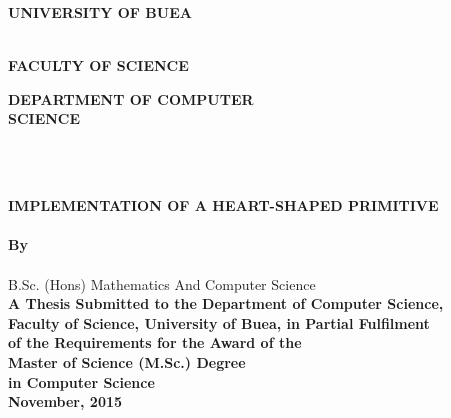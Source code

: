 \documentclass[11pt, oneside]{Thesis} %
\title{\ttitle} %
\begin{document}
\frontmatter %

\begin{titlepage}
\begin{center}
\textsc{\Large \textbf{UNIVERSITY OF BUEA}}\\[25pt]\\[3.0cm] %
\end{center}

\begin{minipage}{0.5\textwidth}
\begin{flushleft}
\large\textbf{FACULTY OF SCIENCE}
\end{flushleft}
\end{minipage}
\begin{minipage}{0.5\textwidth}
\begin{flushright}
\large\textbf{DEPARTMENT OF COMPUTER}\\ \hspace*{290} \textbf{SCIENCE} 
\end{flushright}
\end{minipage}

\hspace{200}\\

\begin{center}
\\[1.5cm]
{\large \bfseries IMPLEMENTATION OF A HEART-SHAPED PRIMITIVE}\\[0.4cm] %
\\[2.5cm]

\large \textbf{ By } \\[0.75cm]

\Large \textbf{\authornames} \\ 

\small B.Sc. (Hons) Mathematics And Computer Science \\[2.5cm]

\large \textbf{A Thesis Submitted to the Department of Computer Science, \\
		Faculty of Science, University of Buea, in Partial Fulfilment \\ 
		of the Requirements for the Award of the \\
		Master of Science (M.Sc.) Degree \\
		in Computer Science}\\[2.5cm]

\large \textbf{November, 2015}

\end{center}

\end{titlepage}
\end{document}
